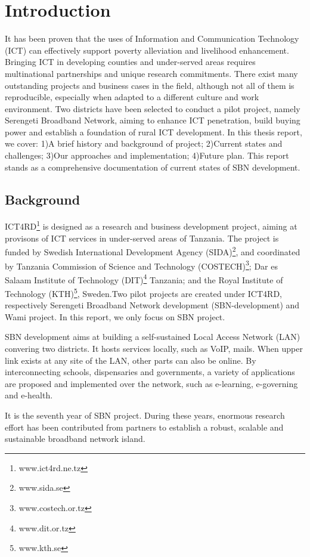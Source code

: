 \chapter{Introduction}
It has been proven that the uses of Information and Communication Technology (ICT) can effectively support poverty alleviation and livelihood enhancement\cite{XXX}. Bringing ICT in developing counties and under-served areas requires multinational partnerships and unique research commitments. There exist many outstanding projects and business cases in the field, although not all of them is reproducible, especially when adapted to a different culture and work environment.
Two districts have been selected to conduct a pilot project, namely Serengeti Broadband Network, aiming to enhance ICT penetration, build buying power and establish a foundation of rural ICT development. In this thesis report, we cover: 1)A brief history and background of project; 2)Current states and challenges; 3)Our approaches and implementation; 4)Future plan. This report stands as a comprehensive documentation of current states of SBN development.

\section{Background}
ICT4RD\footnote{www.ict4rd.ne.tz} is designed as a research and business development project, aiming at provisons of ICT services in under-served areas of Tanzania. The project is funded by Swedish International Development Agency (SIDA)\footnote{www.sida.se}, and coordinated by Tanzania Commission of Science and Technology (COSTECH)\footnote{www.costech.or.tz}; Dar es Salaam Institute of Technology (DIT)\footnote{www.dit.or.tz} Tanzania; and the Royal Institute of Technology (KTH)\footnote{www.kth.se}, Sweden.Two pilot projects are created under ICT4RD, respectively Serengeti Broadband Network development (SBN-development) and Wami project. In this report, we only focus on SBN project.

SBN development aims at building a self-sustained Local Access Network (LAN) convering two districts\cite{nungu_thesis}. It hosts services locally, such as VoIP, mails. When upper link exists at any site of the LAN, other parts can also be online. By interconnecting schools, dispensaries and governments, a variety of applications are proposed and implemented over the network, such as e-learning, e-governing and e-health.

It is the seventh year of SBN project. During these years, enormous research effort has been contributed from partners to establish a robust, scalable and sustainable broadband network island.

